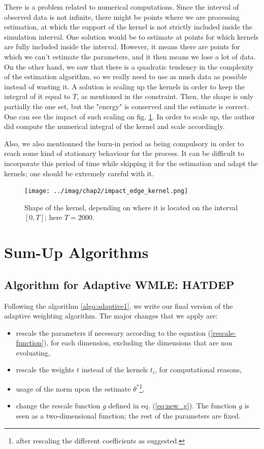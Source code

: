 \documentclass[11pt]{book}
\begin{document}
There is a problem related to numerical computations. Since the interval of observed data is not infinite, there might be points where we are processing estimation, at which the support of the kernel is not strictly included inside the simulation interval. One solution would be to estimate at points for which kernels are fully included inside the interval. However, it means there are points for which we can't estimate the parameters, and it then means we lose a lot of data. On the other hand, we saw that there is a quadratic tendency in the complexity of the estimation algorithm, so we really need to use as much data as possible instead of wasting it. A solution is scaling up the kernels in order to keep the integral of it equal to $T$, as mentioned in the constraint. Then, the shape is only partially the one set, but the "energy" is conserved and the estimate is correct. One can see the impact of such scaling on fig. \ref{fig:scaling_kernels}. In order to scale up, the author did compute the numerical integral of the kernel and scale accordingly.

Also, we also mentionned the burn-in period as being compulsory in order to reach some kind of stationary behaviour for the process. It can be difficult to incorporate this period of time while skipping it for the estimation and adapt the kernels; one should be extremely careful with it.



\begin{figure}
\centering
\texttt{[image: ../imag/chap2/impact\_edge\_kernel.png]}
\caption{Shape of the kernel, depending on where it is located on the interval $[0,T]$; here $T = 2000$.}
\label{fig:scaling_kernels}
\end{figure}



\section{Sum-Up Algorithms}
\subsection{Algorithm for Adaptive WMLE: HATDEP}
Following the algorithm \ref{algo:adaptive1}, we write our final version of the adaptive weighting algorithm. The major changes that we apply are:

\begin{itemize}
\item rescale the parameters if necessary according to the equation (\ref{rescale-function}), for each dimension, excluding the dimensions that are non evoluating,
\item rescale the weights $t$ instead of the kernels $t_i$, for computational reasons,
\item usage of the norm upon the estimate $\theta^*$\footnote{after rescaling the different coefficients as suggested.},
\item change the rescale function $g$ defined in eq. (\ref{eq:new_g}). The function $g$ is seen as a two-dimensional function; the rest of the parameters are fixed.
\end{itemize}
\end{document}
